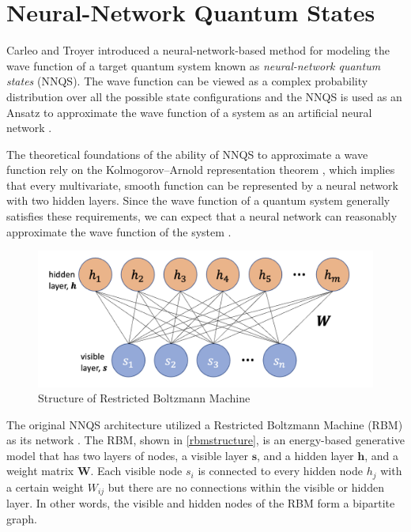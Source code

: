 \section{Neural-Network Quantum States}
Carleo and Troyer \cite{b20} introduced a neural-network-based method for modeling the wave function of a target quantum system known as \textit{neural-network quantum states} (NNQS). The wave function can be viewed as a complex probability distribution over all the possible state configurations and the NNQS is used as an Ansatz to approximate the wave function of a system as an artificial neural network \cite{b25}.

The theoretical foundations of the ability of NNQS to approximate a wave function rely on the Kolmogorov–Arnold representation theorem \cite{kolmogorov1957representation}, which implies that every multivariate, smooth function can be represented by a neural network with two hidden layers. Since the wave function of a quantum system generally satisfies these requirements, we can expect that a neural network can reasonably approximate the wave function of the system \cite{b20}.

\begin{figure}[h!]
    \centering
    \includegraphics[width=0.9\linewidth]{images/rbm_diagram.png}
    \caption{Structure of Restricted Boltzmann Machine}
    \label{rbmstructure}
\end{figure}

The original NNQS architecture utilized a Restricted Boltzmann Machine (RBM) as its network \cite{b20}. The RBM, shown in \autoref{rbmstructure}, is an energy-based generative model that has two layers of nodes, a visible layer $\boldsymbol{s}$, and a hidden layer $\boldsymbol{h}$, and a weight matrix $\mathbf{W}$. Each visible node $s_i$ is connected to every hidden node $h_j$ with a certain weight $W_{ij}$ but there are no connections within the visible or hidden layer. In other words, the visible and hidden nodes of the RBM form a bipartite graph.

